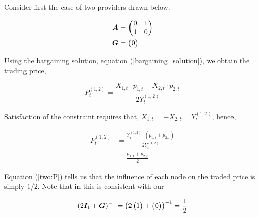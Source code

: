 Consider first the case of two providers drawn below.

\vspace{5mm}
\begin{minipage}{.5\textwidth}
    \resizebox{\textwidth}{!}{}
\end{minipage}
\begin{minipage}{.45\textwidth}
    \begin{equation*}
        \begin{split}
            \bm{A} &= \begin{pmatrix}
                0 & 1 \\
                1 & 0
            \end{pmatrix} \\
            \bm{G} &= \begin{pmatrix}
                0
            \end{pmatrix}
        \end{split}
    \end{equation*}
\end{minipage}
\vspace{5mm}

Using the bargaining solution, equation (\ref{bargaining_solution}), we obtain the trading price,

\begin{equation}
    P^{(1, 2)}_t = \frac{X_{1, t} \cdot p_{1, t} - X_{2, t} \cdot p_{2, t}}{2 Y^{(1, 2)}_t}
\end{equation}

Satisfaction of the constraint requires that, $X_{1, t} = - X_{2, t} = Y^{(1, 2)}_t$, hence,

\begin{equation} \label{two:P}
    \begin{split}
        P^{(1, 2)}_t &= \frac{Y^{(1, 2)}_t \cdot \left( p_{1, t} + p_{2, t} \right)}{2  Y^{(1, 2)}_t} \\
        &= \frac{p_{1, t} + p_{2, t}}{2}
    \end{split}
\end{equation}

Equation (\ref{two:P}) tells us that the influence of each node on the traded price is simply $1 / 2$. Note that in this is consistent with our

\begin{equation}
    (2 \bm{I}_{1} + \bm{G})^{-1} = \left( 2 \begin{pmatrix} 1 \end{pmatrix} + \begin{pmatrix} 0 \end{pmatrix} \right)^{-1} = \frac{1}{2}
\end{equation}

